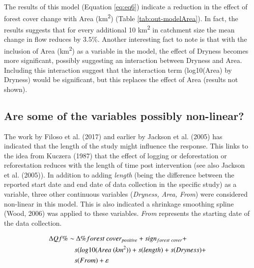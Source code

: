 \documentclass[]{elsarticle} %
\begin{document}
The results of this model (Equation \eqref{eq:eq6}) indicate a reduction in the effect of forest cover change with Area (km\textsuperscript{2}) (Table \ref{tab:out-modelArea}). In fact, the results suggests that for every additional 10 km\textsuperscript{2} in catchment size the mean change in flow reduces by 3.5\%. Another interesting fact to note is that with the inclusion of Area (km\textsuperscript{2}) as a variable in the model, the effect of Dryness becomes more significant, possibly suggesting an interaction between Dryness and Area. Including this interaction suggest that the interaction term (log10(Area) by Dryness) would be significant, but this replaces the effect of Area (results not shown).

\hypertarget{are-some-of-the-variables-possibly-non-linear}{%
\subsection{Are some of the variables possibly non-linear?}\label{are-some-of-the-variables-possibly-non-linear}}

The work by Filoso et al. (2017) and earlier by Jackson et al. (2005) has indicated that the length of the study might influence the response. This links to the idea from Kuczera (1987) that the effect of logging or deforestation or reforestation reduces with the length of time post intervention (see also Jackson et al. (2005)). In addition to adding \emph{length} (being the difference between the reported start date and end date of data collection in the specific study) as a variable, three other continuous variables (\emph{Dryness, Area, From}) were considered non-linear in this model. This is also indicated a shrinkage smoothing spline (Wood, 2006) was applied to these variables. \emph{From} represents the starting date of the data collection.

\begin{align}
\Delta Qf \% \sim &~ \Delta \% forest~cover_{positive} + sign_{forest~cover} + \notag \\ & s(log10(Area ~(km^2)) + s(length) + s(Dryness) + \\ & s(From) + \varepsilon \label{eq:eq7}
\end{align}
\end{document}
